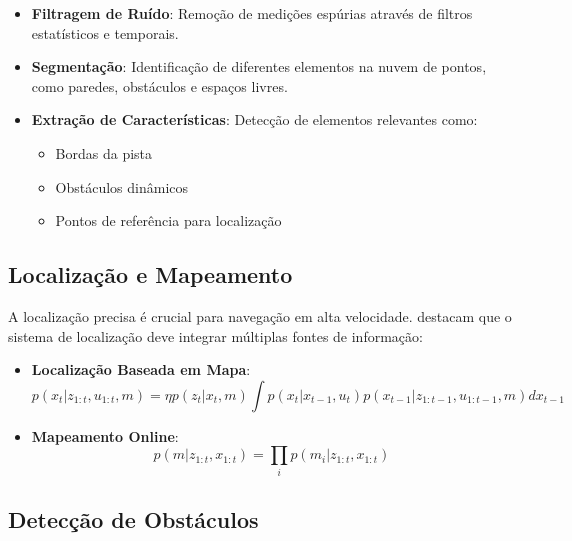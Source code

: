\begin{itemize}
    \item \textbf{Filtragem de Ruído}: Remoção de medições espúrias através de filtros estatísticos e temporais.
    \item \textbf{Segmentação}: Identificação de diferentes elementos na nuvem de pontos, como paredes, obstáculos e espaços livres.
    \item \textbf{Extração de Características}: Detecção de elementos relevantes como:
          \begin{itemize}
              \item Bordas da pista
              \item Obstáculos dinâmicos
              \item Pontos de referência para localização
          \end{itemize}
\end{itemize}

\subsection{Localização e Mapeamento}

A localização precisa é crucial para navegação em alta velocidade.
\cite{Karaman2011Optimal} destacam que o sistema de localização deve integrar
múltiplas fontes de informação:

\begin{itemize}
    \item \textbf{Localização Baseada em Mapa}:
          \begin{equation}
              p(x_t | z_{1:t}, u_{1:t}, m) = \eta p(z_t | x_t, m) \int p(x_t | x_{t-1}, u_t) p(x_{t-1} | z_{1:t-1}, u_{1:t-1}, m) dx_{t-1}
              \label{eq:bayes_filter}
          \end{equation}

    \item \textbf{Mapeamento Online}:
          \begin{equation}
              p(m | z_{1:t}, x_{1:t}) = \prod_i p(m_i | z_{1:t}, x_{1:t})
              \label{eq:mapping_probability}
          \end{equation}
\end{itemize}

\subsection{Detecção de Obstáculos}

